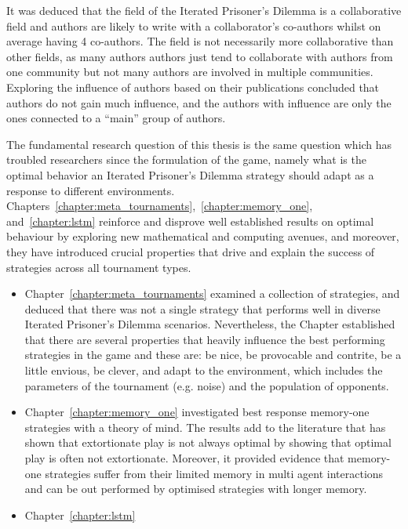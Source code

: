 It was deduced that the field of the Iterated Prisoner's Dilemma is a
collaborative field and authors are likely to write with a collaborator's
co-authors whilst on average having 4 co-authors. The field is not
necessarily more collaborative than other fields, as many authors authors just
tend to collaborate with authors from one community but not many authors are
involved in multiple communities. Exploring the influence of authors based on
their publications concluded that authors do not gain much influence, and the
authors with influence are only the ones connected to a ``main'' group of
authors.

The fundamental research question of this thesis is the same question which has
troubled researchers since the formulation of the game, namely what is the
optimal behavior an Iterated Prisoner's Dilemma strategy should adapt as a
response to different environments.
Chapters~\ref{chapter:meta_tournaments},~\ref{chapter:memory_one},
and~\ref{chapter:lstm} reinforce and disprove well established results on optimal
behaviour by
exploring new mathematical and computing avenues, and moreover, they have introduced
crucial properties that drive and explain the success of strategies across all
tournament types.

\begin{itemize}
    \item Chapter~\ref{chapter:meta_tournaments} examined a collection of
    \numberofstrategies strategies, and deduced that there was not a single
    strategy that performs well in diverse Iterated Prisoner’s Dilemma
    scenarios. Nevertheless, the Chapter established that there are several
    properties that heavily influence the best performing strategies in the game
    and these are: be nice, be provocable and contrite, be a little envious, be
    clever, and adapt to the environment, which includes the parameters of the
    tournament (e.g. noise) and the population of opponents.
    \item Chapter~\ref{chapter:memory_one} investigated  best response memory-one
    strategies with a theory of mind. The results add to the 
    literature that has shown that extortionate play is not always optimal by
    showing that optimal play is often not extortionate. Moreover, it provided
    evidence that memory-one strategies suffer from their limited memory in
    multi agent interactions and can be out performed by optimised strategies
    with longer memory.
    \item Chapter~\ref{chapter:lstm} %
\end{itemize}

